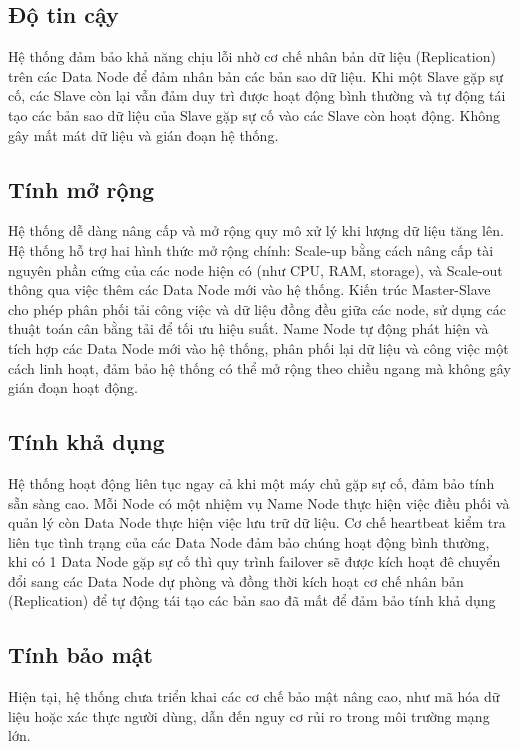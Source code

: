 \documentclass[../main.tex]{subfiles}
\begin{document}
\subsection{Độ tin cậy}
Hệ thống đảm bảo khả năng chịu lỗi nhờ cơ chế nhân bản dữ liệu (Replication) trên các Data Node để đảm nhân bản các bản sao dữ liệu. Khi một Slave gặp sự cố, các Slave còn lại vẫn đảm duy trì được hoạt động bình thường và tự động tái tạo các bản sao dữ liệu của Slave gặp sự cố vào các Slave còn hoạt động. Không gây mất mát dữ liệu và gián đoạn hệ thống.

\subsection{Tính mở rộng}
Hệ thống dễ dàng nâng cấp và mở rộng quy mô xử lý khi lượng dữ liệu tăng lên. Hệ thống hỗ trợ hai hình thức mở rộng chính: Scale-up bằng cách nâng cấp tài nguyên phần cứng của các node hiện có (như CPU, RAM, storage), và Scale-out thông qua việc thêm các Data Node mới vào hệ thống. Kiến trúc Master-Slave cho phép phân phối tải công việc và dữ liệu đồng đều giữa các node, sử dụng các thuật toán cân bằng tải để tối ưu hiệu suất. Name Node tự động phát hiện và tích hợp các Data Node mới vào hệ thống, phân phối lại dữ liệu và công việc một cách linh hoạt, đảm bảo hệ thống có thể mở rộng theo chiều ngang mà không gây gián đoạn hoạt động.

\subsection{Tính khả dụng}
Hệ thống hoạt động liên tục ngay cả khi một máy chủ gặp sự cố, đảm bảo tính sẵn sàng cao. Mỗi Node có một nhiệm vụ Name Node thực hiện việc điều phối và quản lý còn Data Node thực hiện việc lưu trữ dữ liệu. Cơ chế heartbeat kiểm tra liên tục tình trạng của các Data Node đảm bảo chúng hoạt động bình thường, khi có 1 Data Node gặp sự cố thì quy trình failover sẽ được kích hoạt đê chuyển đổi sang các Data Node dự phòng và đồng thời kích hoạt cơ chế nhân bản (Replication) để tự động tái tạo các bản sao đã mất để đảm bảo tính khả dụng

\subsection{Tính bảo mật}
Hiện tại, hệ thống chưa triển khai các cơ chế bảo mật nâng cao, như mã hóa dữ liệu hoặc xác thực người dùng, dẫn đến nguy cơ rủi ro trong môi trường mạng lớn.
\end{document}
